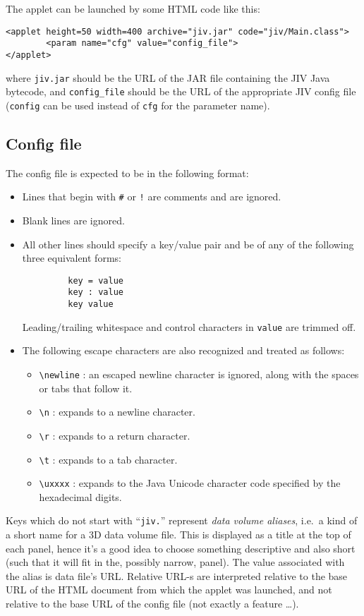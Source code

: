 The applet can be launched by some HTML code like this:
\begin{verbatim}
<applet height=50 width=400 archive="jiv.jar" code="jiv/Main.class">
        <param name="cfg" value="config_file">
</applet>
\end{verbatim}
where \verb+jiv.jar+ should be the URL of the JAR file containing the
JIV Java bytecode, and \verb+config_file+ should be the URL of the
appropriate JIV config file (\verb+config+ can be used instead of
\verb+cfg+ for the parameter name).


\subsection{Config file}
\label{sec:config-file}

The config file is expected to be in the following format:
\begin{itemize}
\item Lines that begin with \verb|#| or \verb|!| are comments and are
  ignored. 
\item Blank lines are ignored.
\item All other lines should specify a key/value pair and be of any of
  the following three equivalent forms:
\begin{verbatim}
         key = value
         key : value
         key value
\end{verbatim}
  Leading/trailing whitespace and control characters in \verb|value|
  are trimmed off.
\item The following escape characters are also recognized and
  treated as follows: 
  \begin{itemize}
  \item \verb|\newline| : 
    an escaped newline character is ignored, along with the spaces or
    tabs that follow it. 
  \item \verb|\n| : expands to a newline character.
  \item \verb|\r| : expands to a return character.
  \item \verb|\t| : expands to a tab character.
  \item \verb|\uxxxx| : expands to the Java Unicode character code
    specified by the hexadecimal digits.  
  \end{itemize}
\end{itemize} 

Keys which do not start with ``\verb+jiv.+'' represent {\em data
  volume aliases}, i.e.\ a kind of a short name for a 3D data volume
file. This is displayed as a title at the top of each panel, hence
it's a good idea to choose something descriptive and also short (such
that it will fit in the, possibly narrow, panel). The value associated
with the alias is data file's URL\@. Relative URL-s are interpreted
relative to the base URL of the HTML document from which the applet
was launched, and not relative to the base URL of the config file (not
exactly a feature \ldots).

